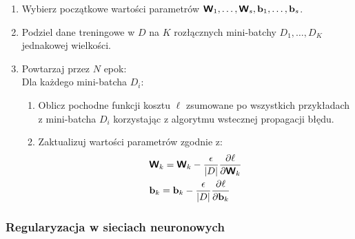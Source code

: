 \documentclass{myclass}
\begin{document}
\begin{tcolorbox}[title=Algorytm mBGD]
\begin{enumerate}
    \item Wybierz początkowe wartości parametrów \(\boldsymbol{\mathsf{W}}_1, \ldots,\boldsymbol{\mathsf{W}}_s, \mathbf{b}_1,
    \ldots, \mathbf{b}_s\).

    \item Podziel dane treningowe w \(D\) na \(K\) rozłącznych mini-batchy \(D_1, \ldots, D_K\)
    jednakowej wielkości.
    
    \item Powtarzaj przez \(N\) epok: \\
    Dla każdego mini-batcha \(D_i\):
    \begin{enumerate}
        \item Oblicz pochodne funkcji kosztu \(\ell\) zsumowane po wszystkich przykładach z
        mini-batcha \(D_i\) korzystając z algorytmu wstecznej propagacji błędu.

        \item Zaktualizuj wartości parametrów zgodnie z:
        \begin{equation*}
            \begin{split}
                &\boldsymbol{\mathsf{W}}_k = \boldsymbol{\mathsf{W}}_k - \frac{\epsilon}{|D|}\pdv{\ell}{\boldsymbol{\mathsf{W}}_k}\\
                &\mathbf{b}_k = \mathbf{b}_k - \frac{\epsilon}{|D|}\pdv{\ell}{\mathbf{b}_k}\\
            \end{split}
        \end{equation*}
    \end{enumerate}
\end{enumerate}
\end{tcolorbox}

\subsubsection{Regularyzacja w sieciach neuronowych}
\end{document}
